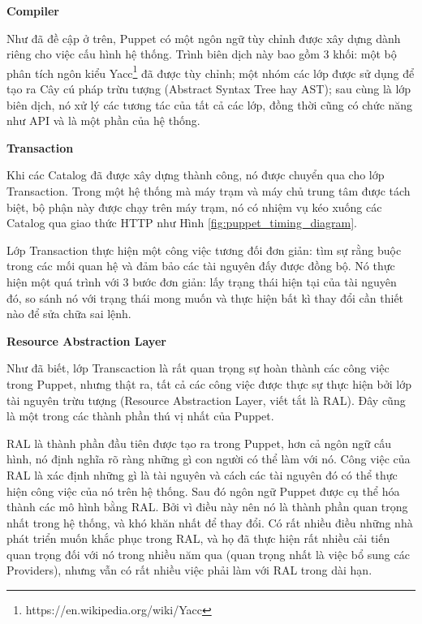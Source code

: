 \newpage
\clearpage

\textbf{\large Compiler}


Như đã đề cập ở trên, Puppet có một ngôn ngữ tùy chỉnh được xây dựng dành riêng cho việc cấu hình hệ thống. Trình biên dịch này bao gồm 3 khối: một bộ phân tích ngôn kiểu Yacc\footnote{https://en.wikipedia.org/wiki/Yacc} đã được tùy chỉnh; một nhóm các lớp được sử dụng để tạo ra Cây cú pháp trừu tượng (Abstract Syntax Tree hay AST); sau cùng là lớp biên dịch, nó xử lý các tương tác của tất cả các lớp, đồng thời cũng có chức năng như API và là một phần của hệ thống.


\textbf{\large Transaction}


Khi các Catalog đã được xây dựng thành công, nó được chuyển qua cho lớp Transaction. Trong một hệ thống mà máy trạm và máy chủ trung tâm được tách biệt, bộ phận này được chạy trên máy trạm, nó có nhiệm vụ kéo xuống các Catalog qua giao thức HTTP như Hình \ref{fig:puppet_timing_diagram}.

Lớp Transaction thực hiện một công việc tương đối đơn giản: tìm sự rằng buộc trong các mối quan hệ và đảm bảo các tài nguyên đấy được đồng bộ. Nó thực hiện một quá trình với 3 bước đơn giản: lấy trạng thái hiện tại của tài nguyên đó, so sánh nó với trạng thái mong muốn và thực hiện bất kì thay đổi cần thiết nào để sửa chữa sai lệnh.


\textbf{\large Resource Abstraction Layer}


Như đã biết, lớp Transcaction là rất quan trọng sự hoàn thành các công việc trong Puppet, nhưng thật ra, tất cả các công việc được thực sự thực hiện bởi lớp tài nguyên trừu tượng (Resource Abstraction Layer, viết tắt là RAL). Đây cũng là một trong các thành phần thú vị nhất của Puppet.

RAL là thành phần đầu tiên được tạo ra trong Puppet, hơn cả ngôn ngữ cấu hình, nó định nghĩa rõ ràng những gì con người có thể làm với nó. Công việc của RAL là xác định những gì là tài nguyên và cách các tài nguyên đó có thể thực hiện công việc của nó trên hệ thống. Sau đó ngôn ngữ Puppet được cụ thể hóa thành các mô hình bằng RAL. Bởi vì điều này nên nó là thành phần quan trọng nhất trong hệ thống, và khó khăn nhất để thay đổi. Có rất nhiều điều những nhà phát triển muốn khắc phục trong RAL, và họ đã thực hiện rất nhiều cải tiến quan trọng đối với nó trong nhiều năm qua (quan trọng nhất là việc bổ sung các Providers), nhưng vẫn có rất nhiều việc phải làm với RAL trong dài hạn.

